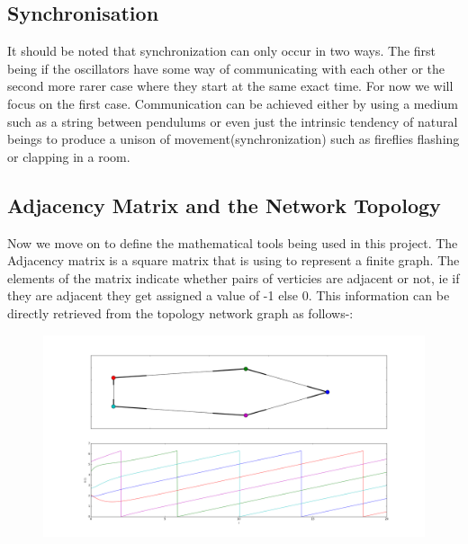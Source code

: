 \subsection{Synchronisation}
It should be noted that synchronization can only occur in two ways. The first being if the oscillators have some way of communicating with each other or the second more rarer case where they start at the same exact time. For now we will focus on the first case. Communication can be achieved either by using a medium such as a string between pendulums or even just the intrinsic tendency of natural beings to produce a unison of movement(synchronization) such as fireflies flashing or clapping in a room.

\subsection{Adjacency Matrix and the Network Topology }
Now we move on to define the mathematical tools being used in this project. The Adjacency matrix is a square matrix that is using to represent a finite graph. The elements of the matrix indicate whether pairs of verticies are adjacent or not, ie if they are adjacent they get assigned a value of -1 else 0. This information can be directly retrieved from the topology network graph as follows-:

\begin{figure}[h!]
\centering
\includegraphics[width=\linewidth]{imgs/examplefigure}
\caption{}
\end{figure}

